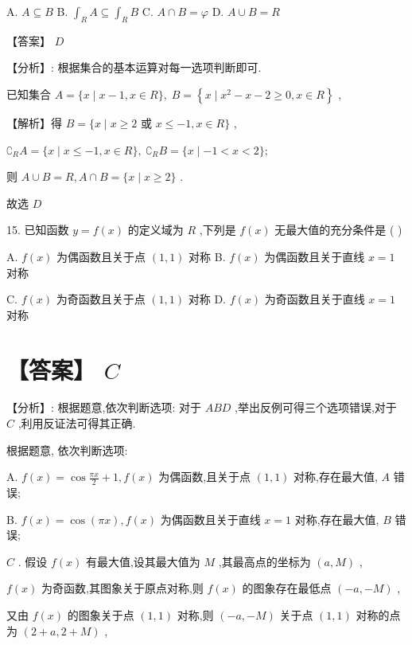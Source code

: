 \documentclass[10pt]{article}
\begin{document}
A. \(A \subseteq  B\) B. \({\int }_{R}A \subseteq  {\int }_{R}B\) C. \(A \cap  B = \varphi\) D. \(A \cup  B = R\)

【答案】 \(D\)

【分析】: 根据集合的基本运算对每一选项判断即可.

已知集合 \(A = \{ x \mid  x - 1,x \in  R\} ,\;B = \left\{  {x \mid  {x}^{2} - x - 2 \geq  0,x \in  R}\right\}\) ,

【解析】得 \(B = \{ x \mid  x \geq  2\) 或 \(x \leq   - 1,x \in  R\}\) ,

\({\complement }_{R}A = \{ x \mid  x \leq   - 1,x \in  R\} ,\;{\complement }_{R}B = \{ x \mid   - 1 < x < 2\} ;\)

则 \(A \cup  B = R,A \cap  B = \{ x \mid  x \geq  2\}\) .

故选 \(D\)

15. 已知函数 \(y = f\left( x\right)\) 的定义域为 \(R\) ,下列是 \(f\left( x\right)\) 无最大值的充分条件是 ( )

A. \(f\left( x\right)\) 为偶函数且关于点 \(\left( {1,1}\right)\) 对称 B. \(f\left( x\right)\) 为偶函数且关于直线 \(x = 1\) 对称

C. \(f\left( x\right)\) 为奇函数且关于点 \(\left( {1,1}\right)\) 对称 D. \(f\left( x\right)\) 为奇函数且关于直线 \(x = 1\) 对称

\section*{【答案】 \(C\)}

【分析】: 根据题意,依次判断选项: 对于 \({ABD}\) ,举出反例可得三个选项错误,对于 \(C\) ,利用反证法可得其正确.

根据题意, 依次判断选项:

A. \(f\left( x\right)  = \cos \frac{\pi x}{2} + 1,f\left( x\right)\) 为偶函数,且关于点 \(\left( {1,1}\right)\) 对称,存在最大值, \(A\) 错误;

B. \(f\left( x\right)  = \cos \left( {\pi x}\right) ,f\left( x\right)\) 为偶函数且关于直线 \(x = 1\) 对称,存在最大值, \(B\) 错误;

\(C\) . 假设 \(f\left( x\right)\) 有最大值,设其最大值为 \(M\) ,其最高点的坐标为 \(\left( {a,M}\right)\) ,

\(f\left( x\right)\) 为奇函数,其图象关于原点对称,则 \(f\left( x\right)\) 的图象存在最低点 \(\left( {-a, - M}\right)\) ,

又由 \(f\left( x\right)\) 的图象关于点 \(\left( {1,1}\right)\) 对称,则 \(\left( {-a, - M}\right)\) 关于点 \(\left( {1,1}\right)\) 对称的点为 \(\left( {2 + a,2 + M}\right)\) ,
\end{document}
